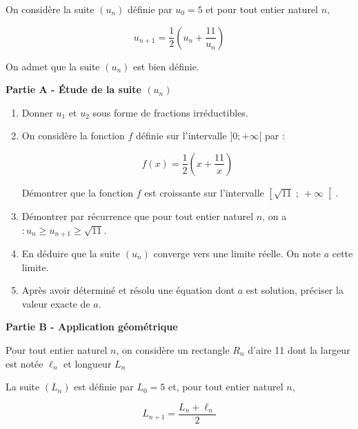 \medskip

On considère la suite $\left(u_{n}\right)$ définie par $u_{0}=5$ et pour tout entier naturel $n$,

\[	u_{n+1}=\frac{1}{2}\left(u_{n}+\frac{11}{u_{n}}\right)\]

On admet que la suite $\left(u_{n}\right)$ est bien définie.

\medskip

\textbf{Partie A - Étude de la suite \boldmath$ \left(u_{n}\right)$}\unboldmath

\medskip

\begin{enumerate}
\item Donner $u_{1}$ et $u_{2}$ sous forme de fractions irréductibles.
\item On considère la fonction $f$ définie sur l'intervalle $]0 ; +\infty [$ par :

\[f(x)=\frac{1}{2}\left(x+\frac{11}{x}\right)\]

Démontrer que la fonction $f$ est croissante sur l'intervalle $\left[\sqrt{11}~;~+\infty\right[$.
\item Démontrer par récurrence que pour tout entier naturel $n$, on a $: u_{n} \geqslant u_{n+1} \geqslant \sqrt{11}$.
\item En déduire que la suite $\left(u_{n}\right)$ converge vers une limite réelle. On note $a$ cette limite.
\item Après avoir déterminé et résolu une équation dont $a$ est solution, préciser la valeur exacte de $a$.
\end{enumerate}

\medskip

\textbf{Partie B - Application géométrique}

\medskip

Pour tout entier naturel $n$, on considère un rectangle $R_{n}$ d'aire 11 dont la largeur est notée $\ell_{n}$ et longueur $L_{n}$

La suite $\left(L_{n}\right)$ est définie par $L_{0}=5$ et, pour tout entier naturel $n$,

\[L_{n+1}=\frac{L_{n}+\ell_{n}}{2} \]


